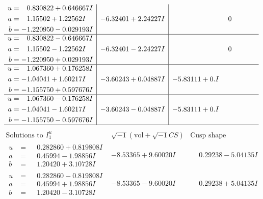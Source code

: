 \documentclass[1p]{elsarticle_modified}
\theoremstyle{definition}
\newcommand{\I}{\sqrt{-1}}
\begin{document}
$$\begin{array}{c|c|c}
\begin{aligned}
u &= \phantom{-}0.830822 + 0.646667 I \\
a &= \phantom{-}1.15502 + 1.22562 I \\
b &= -1.220950 - 0.029193 I\end{aligned}
 & -6.32401 + 2.24227 I & \phantom{-0.000000 } 0 \\ \hline\begin{aligned}
u &= \phantom{-}0.830822 - 0.646667 I \\
a &= \phantom{-}1.15502 - 1.22562 I \\
b &= -1.220950 + 0.029193 I\end{aligned}
 & -6.32401 - 2.24227 I & \phantom{-0.000000 } 0 \\ \hline\begin{aligned}
u &= \phantom{-}1.067360 + 0.176258 I \\
a &= -1.04041 + 1.60217 I \\
b &= -1.155750 + 0.597676 I\end{aligned}
 & -3.60243 + 0.04887 I & -5.83111 + 0. I\phantom{ +0.000000I} \\ \hline\begin{aligned}
u &= \phantom{-}1.067360 - 0.176258 I \\
a &= -1.04041 - 1.60217 I \\
b &= -1.155750 - 0.597676 I\end{aligned}
 & -3.60243 - 0.04887 I & -5.83111 + 0. I\phantom{ +0.000000I}\\
 \hline 
 \end{array}$$\newpage$$\begin{array}{c|c|c}  
\text{Solutions to }I^u_{1}& \I (\text{vol} + \sqrt{-1}CS) & \text{Cusp shape}\\
 \hline 
\begin{aligned}
u &= \phantom{-}0.282860 + 0.819808 I \\
a &= \phantom{-}0.45994 - 1.98856 I \\
b &= \phantom{-}1.20420 + 3.10728 I\end{aligned}
 & -8.53365 + 9.60020 I & \phantom{-}0.29238 - 5.04135 I \\ \hline\begin{aligned}
u &= \phantom{-}0.282860 - 0.819808 I \\
a &= \phantom{-}0.45994 + 1.98856 I \\
b &= \phantom{-}1.20420 - 3.10728 I\end{aligned}
 & -8.53365 - 9.60020 I & \phantom{-}0.29238 + 5.04135 I \\ \hline\begin{aligned}

\end{aligned}
\end{array}$$
\end{document}
